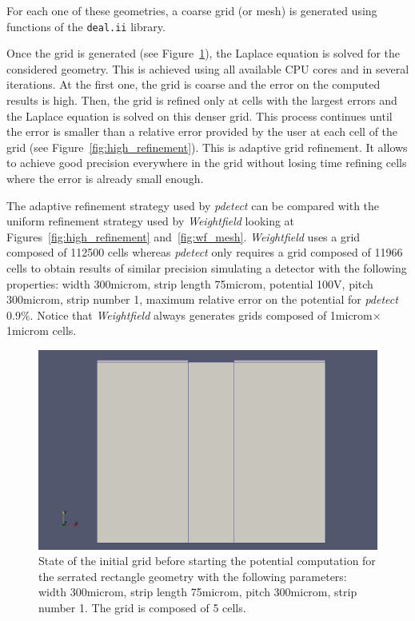 \documentclass[11pt]{article}
\begin{document}
	For each one of these geometries, a coarse grid (or mesh) is generated using
	functions of the \texttt{deal.ii} library.

	Once the grid is generated (see Figure~\ref{fig:no_refinement}), the Laplace equation is solved for the considered
	geometry. This is achieved using all available CPU cores and in several iterations.
	At the first one, the
	grid is coarse and the error on the computed results is high. Then, the grid is
	refined only at cells with the largest errors and the Laplace equation is
	solved on this denser grid. This process continues until
	the error is smaller than a relative error provided by the user at each cell of
	the grid (see Figure~\ref{fig:high_refinement}). This is adaptive grid refinement. It allows to achieve good precision
	everywhere in the grid without losing time refining cells where the error is already small
	enough.

	The adaptive refinement strategy used by \textit{pdetect} can be compared with
	the uniform refinement strategy used by \textit{Weightfield} looking at
	Figures~\ref{fig:high_refinement} and~\ref{fig:wf_mesh}. \textit{Weightfield}
	uses a grid composed of 112500 cells whereas \textit{pdetect} only requires a
	grid composed of 11966 cells to obtain results of similar precision simulating
	a detector with the following properties: width 300microm, strip length
	75microm, potential 100V, pitch 300microm, strip number 1, maximum relative
	error on the potential for \textit{pdetect} 0.9$\%$. Notice that \textit{Weightfield}
	always generates grids composed of 1microm$\times$1microm cells.

	\begin{figure}[H]
	  \center
	  \includegraphics[scale=0.3]{images/grid_refinement/no_refinement_2.png}
		\caption{State of the initial grid before starting the potential computation
		for the serrated rectangle geometry with the following parameters:
		width 300microm, strip length
		75microm, pitch 300microm, strip number 1. The grid is composed of 5 cells.}
	  \label{fig:no_refinement}
	\end{figure}
\end{document}
